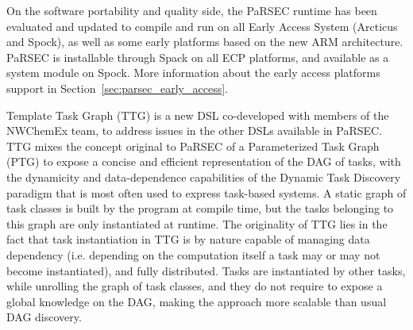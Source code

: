 %
%
On the software portability and quality side, the PaRSEC runtime has been evaluated
and updated to compile and run on all Early Access System (Arcticus
and Spock), as well as some early platforms based on the new ARM
architecture.  PaRSEC is installable through Spack on all ECP platforms,
and available as a system module on Spock. More information about the early
access platforms support in Section~\ref{sec:parsec_early_access}.

%
%
Template Task Graph (TTG) is a new DSL co-developed with members of
the NWChemEx team, to address issues in the other DSLs available in
PaRSEC. TTG mixes the concept original to PaRSEC of a Parameterized
Task Graph (PTG) to expose a concise and efficient representation of
the DAG of tasks, with the dynamicity and data-dependence capabilities
of the Dynamic Task Discovery paradigm that is most often used to
express task-based systems. A static graph of task classes is built
by the program at compile time, but the tasks belonging to this graph
are only instantiated at runtime. The originality of TTG lies
in the fact that task instantiation in TTG is by nature capable of
managing data dependency (i.e. depending on the computation itself a
task may or may not become instantiated), and fully distributed.
Tasks are instantiated by other tasks, while unrolling the graph of
task classes, and they do not require to expose a global knowledge on
the DAG, making the approach more scalable than usual DAG discovery.

